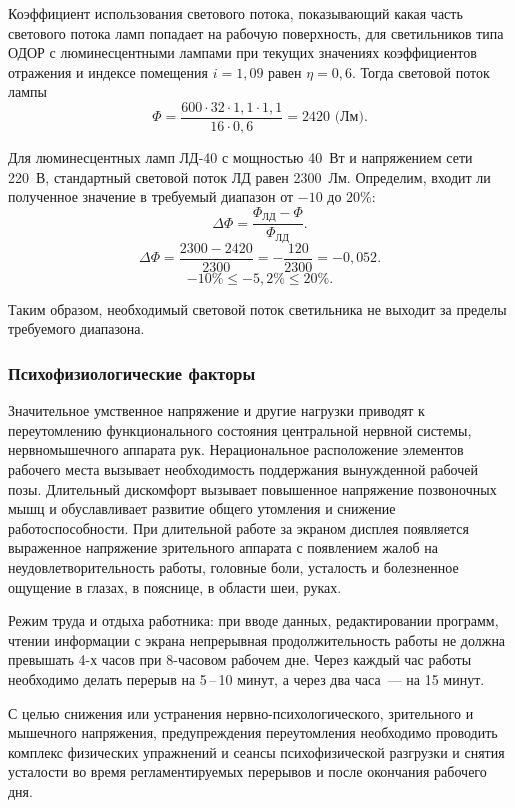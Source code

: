 Коэффициент использования светового потока, показывающий какая часть светового потока ламп попадает на рабочую поверхность, для светильников типа ОДОР с люминесцентными лампами при текущих значениях коэффициентов отражения и индексе помещения $i = 1,09$ равен $\eta = 0,6$.
Тогда световой поток лампы
$$\Phi = \frac{600 \cdot 32 \cdot 1,1 \cdot 1,1}{16 \cdot 0,6} = 2420 \text{ (Лм)}.$$

Для люминесцентных ламп ЛД-40 с мощностью 40~Вт и напряжением сети 220~В, стандартный световой поток ЛД равен 2300~Лм.
Определим, входит ли полученное значение в требуемый диапазон от $-10$ до $20\%$:
\begin{equation}
    \Delta\Phi = \frac{\Phi_\text{ЛД} - \Phi}{\Phi_\text{ЛД}}.
\end{equation}
$$\Delta\Phi = \frac{2300 - 2420}{2300} = -\frac{120}{2300} = -0,052.$$
$$-10\% \le -5,2\% \le 20\%.$$

Таким образом, необходимый световой поток светильника не выходит за пределы требуемого диапазона.


\subsubsection{Психофизиологические факторы}

Значительное умственное напряжение и другие нагрузки приводят к переутомлению функционального состояния центральной нервной системы, нервно\-мышечного аппарата рук. 
Нерациональное расположение элементов рабочего места вызывает необходимость поддержания вынужденной рабочей позы. 
Длительный дискомфорт вызывает повышенное напряжение позвоночных мышц и обуславливает развитие общего утомления и снижение работоспособности.
При длительной работе за экраном дисплея появляется выраженное напряжение зрительного аппарата с появлением жалоб на неудовлетворительность работы, головные боли, усталость и болезненное ощущение в глазах, в пояснице, в области шеи, руках.

Режим труда и отдыха работника: при вводе данных, редактировании программ, чтении информации с экрана непрерывная продолжительность работы не должна превышать 4-х часов при 8-часовом рабочем дне. 
Через каждый час работы необходимо делать перерыв на 5\,--\,10 минут, а через два часа~--- на 15 минут.

С целью снижения или устранения нервно-психологического, зрительного и мышечного напряжения, предупреждения переутомления необходимо проводить комплекс физических упражнений и сеансы психофизической разгрузки и снятия усталости во время регламентируемых перерывов и после окончания рабочего дня.


